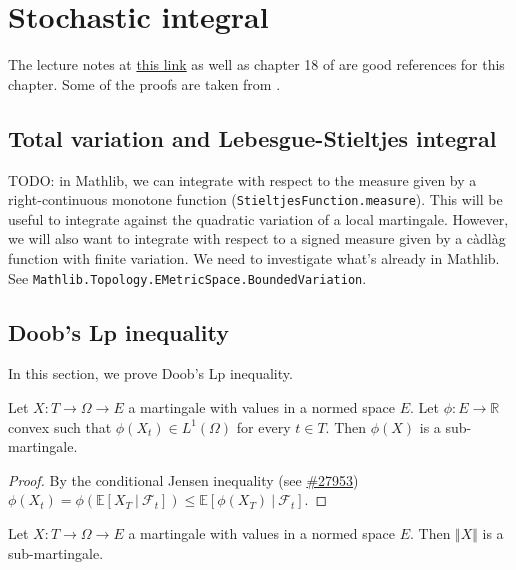 \chapter{Stochastic integral}

The lecture notes at \href{https://dec41.user.srcf.net/h/III_L/stochastic_calculus_and_applications/}{this link} as well as chapter 18 of \cite{kallenberg2021} are good references for this chapter.
Some of the proofs are taken from \cite{pascucci2024}.

\section{Total variation and Lebesgue-Stieltjes integral}

TODO: in Mathlib, we can integrate with respect to the measure given by a right-continuous monotone function (\texttt{StieltjesFunction.measure}). This will be useful to integrate against the quadratic variation of a local martingale.
However, we will also want to integrate with respect to a signed measure given by a càdlàg function with finite variation.
We need to investigate what's already in Mathlib. See \texttt{Mathlib.Topology.EMetricSpace.BoundedVariation}.


\section{Doob's Lp inequality}

In this section, we prove Doob's Lp inequality.

\begin{lemma}\label{lem:convex_of_mg_is_submg}
Let $X : T \rightarrow \Omega\rightarrow E$ a martingale with values in a normed space $E$.
Let $\phi : E \rightarrow \mathbb{R}$ convex such that
$\phi(X_t)\in L^1(\Omega)$ for every $t\in T$. Then $\phi(X)$ is a sub-martingale.
\end{lemma}

\begin{proof}
  By the conditional Jensen inequality (see \href{https://github.com/leanprover-community/mathlib4/pull/27953}{\#27953})
  $\phi(X_t) = \phi\left( \mathbb{E}[X_T\ |\ \mathcal{F}_t] \right)\leq \mathbb{E}[\phi(X_T)\ |\ \mathcal{F}_t]$.
\end{proof}


\begin{corollary}\label{cor:Martingale.submartingale_norm}
  Let $X : T \rightarrow \Omega \rightarrow E$ a martingale with values in a normed space $E$.
  Then $\Vert X \Vert$ is a sub-martingale.
\end{corollary}

